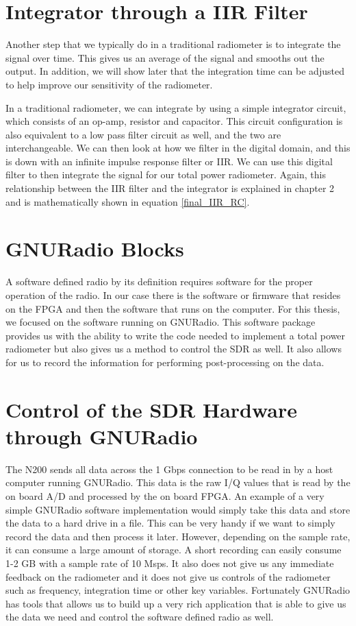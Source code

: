 \section{Integrator through a IIR Filter}

Another step that we typically do in a traditional radiometer is to integrate the signal over time.  This gives us an average of the signal and smooths out the output.  In addition, we will show later that the integration time can be adjusted to help improve our sensitivity of the radiometer.

In a traditional radiometer, we can integrate by using a simple integrator circuit, which consists of an op-amp, resistor and capacitor.  This circuit configuration is also equivalent to a low pass filter circuit as well, and the two are interchangeable.  We can then look at how we filter in the digital domain, and this is down with an infinite impulse response filter or IIR.  We can use this digital filter to then integrate the signal for our total power radiometer. Again, this relationship between the IIR filter and the integrator is explained in chapter 2 and is mathematically shown in equation \ref{final_IIR_RC}.

\section{GNURadio Blocks}
A software defined radio by its definition requires software for the proper operation of the radio.  In our case there is the software or firmware that resides on the FPGA and then the software that runs on the computer.  For this thesis, we focused on the software running on GNURadio.  This software package provides us with the ability to write the code needed to implement a total power radiometer but also gives us a method to control the SDR as well.  It also allows for us to record the information for performing post-processing on the data.

\section{Control of the SDR Hardware through GNURadio}
The N200 sends all data across the 1 Gbps connection to be read in by a host computer running GNURadio.  This data is the raw I/Q values that is read by the on board A/D and processed by the on board FPGA.  An example of a very simple GNURadio software implementation would simply take this data and store the data to a hard drive in a file.  This can be very handy if we want to simply record the data and then process it later.  However, depending on the sample rate, it can consume a large amount of storage.  A short recording can easily consume 1-2 GB with a sample rate of 10 Msps.  It also does not give us any immediate feedback on the radiometer and it does not give us controls of the radiometer such as frequency, integration time or other key variables.  Fortunately GNURadio has tools that allows us to build up a very rich application that is able to give us the data we need and control the software defined radio as well.


